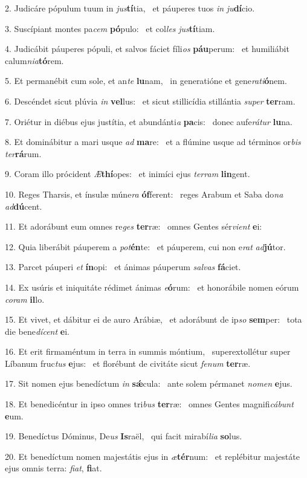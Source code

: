 2. Judicáre pópulum tuum in \textit{jus}\textbf{tí}tia, \ast\  et páuperes tuos \textit{in} \textit{ju}\textbf{dí}cio.\

3. Suscípiant montes pa\textit{cem} \textbf{pó}pulo: \ast\  et col\textit{les} \textit{jus}\textbf{tí}tiam.\

4. Judicábit páuperes pópuli, et salvos fáciet fíli\textit{os} \textbf{páu}perum: \ast\  et humiliábit calum\textit{ni}\textit{a}\textbf{tó}rem.\

5. Et permanébit cum sole, et an\textit{te} \textbf{lu}nam, \ast\  in generatióne et gene\textit{ra}\textit{ti}\textbf{ó}nem.\

6. Descéndet sicut plúvia \textit{in} \textbf{vel}lus: \ast\  et sicut stillicídia stillántia \textit{su}\textit{per} \textbf{ter}ram.\

7. Oriétur in diébus ejus justítia, et abundánti\textit{a} \textbf{pa}cis: \ast\  donec aufe\textit{rá}\textit{tur} \textbf{lu}na.\

8. Et dominábitur a mari usque \textit{ad} \textbf{ma}re: \ast\  et a flúmine usque ad términos or\textit{bis} \textit{ter}\textbf{rá}rum.\

9. Coram illo prócident \textit{Æ}\textbf{thí}opes: \ast\  et inimíci ejus \textit{ter}\textit{ram} \textbf{lin}gent.\

10. Reges Tharsis, et ínsulæ múne\textit{ra} \textbf{óf}ferent: \ast\  reges Arabum et Saba do\textit{na} \textit{ad}\textbf{dú}cent.\

11. Et adorábunt eum omnes re\textit{ges} \textbf{ter}ræ: \ast\  omnes Gentes sér\textit{vi}\textit{ent} \textbf{e}i:\

12. Quia liberábit páuperem a \textit{pot}\textbf{én}te: \ast\  et páuperem, cui non e\textit{rat} \textit{ad}\textbf{jú}tor.\

13. Parcet páuperi \textit{et} \textbf{ín}opi: \ast\  et ánimas páuperum \textit{sal}\textit{vas} \textbf{fá}ciet.\

14. Ex usúris et iniquitáte rédimet ánimas \textit{e}\textbf{ó}rum: \ast\  et honorábile nomen eórum \textit{co}\textit{ram} \textbf{il}lo.\

15. Et vivet, et dábitur ei de auro Arábiæ, \dag\  et adorábunt de ip\textit{so} \textbf{sem}per: \ast\  tota die bene\textit{dí}\textit{cent} \textbf{e}i.\

16. Et erit firmaméntum in terra in summis móntium, \dag\  superextollétur super Líbanum fruc\textit{tus} \textbf{e}jus: \ast\  et florébunt de civitáte sicut \textit{fe}\textit{num} \textbf{ter}ræ.\

17. Sit nomen ejus benedíctum \textit{in} \textbf{sǽ}cula: \ast\  ante solem pérmanet \textit{no}\textit{men} \textbf{e}jus.\

18. Et benedicéntur in ipso omnes tri\textit{bus} \textbf{ter}ræ: \ast\  omnes Gentes magnifi\textit{cá}\textit{bunt} \textbf{e}um.\

19. Benedíctus Dóminus, De\textit{us} \textbf{Is}raël, \ast\  qui facit mirabí\textit{li}\textit{a} \textbf{so}lus.\

20. Et benedíctum nomen majestátis ejus in \textit{æ}\textbf{tér}num: \ast\  et replébitur majestáte ejus omnis terra: \textit{fi}\textit{at}, \textbf{fi}at.\

